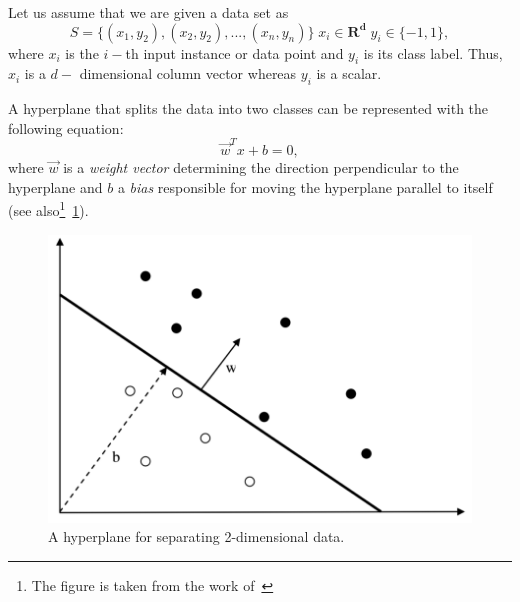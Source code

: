 Let us assume that we are given a data set as
\[  S = \{(x_1,y_2), (x_2,y_2), ...,(x_n,y_n) \} \; x_i \in \mathbf{R^d} \; y_i \in \{-1,1\}, \]
where \( x_i\) is the \( i-\)th input instance or data point and \( y_i\) is its class label. Thus, \(x_i\) is a \(d-\) dimensional column vector whereas \( y_i\) is a scalar.

A hyperplane that splits the data into two classes can be represented with the following equation:
\[\vec{w}^Tx + b = 0, \] 
where \(\vec{w}\) is a \textit{weight vector} determining the direction perpendicular to the hyperplane and \(b\) a \textit{bias} responsible for moving the hyperplane parallel to itself (see also\footnote{The figure is taken from the work of~\cite{Okun;Valentini:2009}}~\ref{fig:hyperplane1}).

\begin{figure}[h!]
    \centering %
    \includegraphics[scale=0.6]{Graphics/svm1.png}
    \caption{A hyperplane for separating 2-dimensional data.}
    \label{fig:hyperplane1}
\end{figure}


